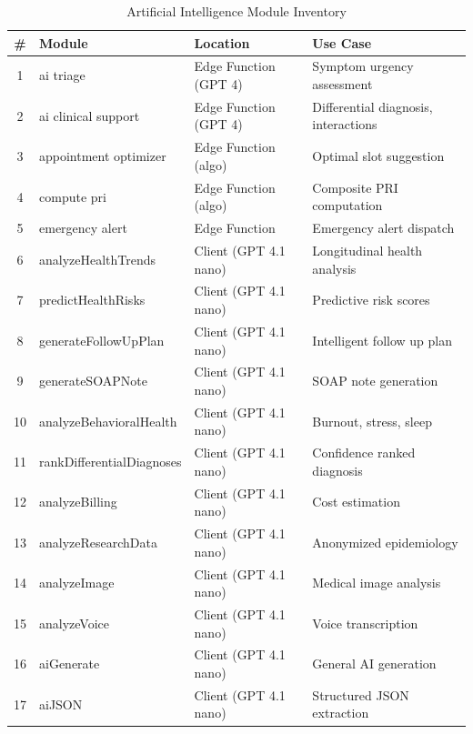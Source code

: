 \documentclass[12pt,a4paper,oneside]{report}
\begin{document}
\begin{table}[H]
\centering
\caption{Artificial Intelligence Module Inventory}
\label{tab:ai modules}
\small
\begin{tabular}{|c|l|l|l|}
\hline
\textbf{\#} & \textbf{Module} & \textbf{Location} & \textbf{Use Case} \\
\hline
1  & ai triage                & Edge Function (GPT 4) & Symptom urgency assessment \\
\hline
2  & ai clinical support      & Edge Function (GPT 4) & Differential diagnosis, interactions \\
\hline
3  & appointment optimizer    & Edge Function (algo)  & Optimal slot suggestion \\
\hline
4  & compute pri              & Edge Function (algo)  & Composite PRI computation \\
\hline
5  & emergency alert          & Edge Function         & Emergency alert dispatch \\
\hline
6  & analyzeHealthTrends      & Client (GPT 4.1 nano) & Longitudinal health analysis \\
\hline
7  & predictHealthRisks       & Client (GPT 4.1 nano) & Predictive risk scores \\
\hline
8  & generateFollowUpPlan     & Client (GPT 4.1 nano) & Intelligent follow up plan \\
\hline
9  & generateSOAPNote         & Client (GPT 4.1 nano) & SOAP note generation \\
\hline
10 & analyzeBehavioralHealth  & Client (GPT 4.1 nano) & Burnout, stress, sleep \\
\hline
11 & rankDifferentialDiagnoses & Client (GPT 4.1 nano) & Confidence ranked diagnosis \\
\hline
12 & analyzeBilling           & Client (GPT 4.1 nano) & Cost estimation \\
\hline
13 & analyzeResearchData      & Client (GPT 4.1 nano) & Anonymized epidemiology \\
\hline
14 & analyzeImage             & Client (GPT 4.1 nano) & Medical image analysis \\
\hline
15 & analyzeVoice             & Client (GPT 4.1 nano) & Voice transcription \\
\hline
16 & aiGenerate               & Client (GPT 4.1 nano) & General AI generation \\
\hline
17 & aiJSON                   & Client (GPT 4.1 nano) & Structured JSON extraction \\
\hline
\end{tabular}
\end{table}
\end{document}
